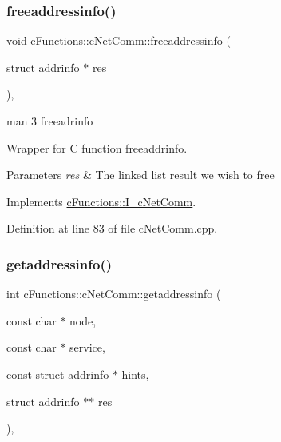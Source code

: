 \subsubsection{\texorpdfstring{freeaddressinfo()}{freeaddressinfo()}}
{\footnotesize\ttfamily void c\+Functions\+::c\+Net\+Comm\+::freeaddressinfo (\begin{DoxyParamCaption}\item[{struct addrinfo $\ast$}]{res }\end{DoxyParamCaption})\hspace{0.3cm}{\ttfamily [override]}, {\ttfamily [virtual]}}



man 3 freeadrinfo 

Wrapper for C function freeaddrinfo.


\begin{DoxyParams}{Parameters}
{\em res} & The linked list result we wish to free \\
\hline
\end{DoxyParams}


Implements \mbox{\hyperlink{classcFunctions_1_1I__cNetComm_ae008e99e178efaa2c4f389c54e350d67}{c\+Functions\+::\+I\+\_\+c\+Net\+Comm}}.



Definition at line 83 of file c\+Net\+Comm.\+cpp.

\mbox{\label{classcFunctions_1_1cNetComm_a131fdff9c6242f5b7df5dc82b1ece91c}} 
\subsubsection{\texorpdfstring{getaddressinfo()}{getaddressinfo()}}
{\footnotesize\ttfamily int c\+Functions\+::c\+Net\+Comm\+::getaddressinfo (\begin{DoxyParamCaption}\item[{const char $\ast$}]{node,  }\item[{const char $\ast$}]{service,  }\item[{const struct addrinfo $\ast$}]{hints,  }\item[{struct addrinfo $\ast$$\ast$}]{res }\end{DoxyParamCaption})\hspace{0.3cm}{\ttfamily [override]}, {\ttfamily [virtual]}}



